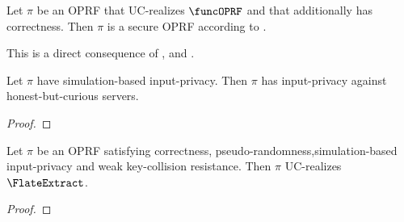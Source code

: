 \begin{corollary}
    \label{coro:UCfromGames}
   Let $\pi$ be an OPRF that UC-realizes $\funcOPRF$ and that additionally has correctness. Then $\pi$ is a secure OPRF according to . 
\end{corollary}
This is a direct consequence of , and .

\begin{lemma}
    \label{lem:GameInputPrivFromSim}
    Let $\pi$ have simulation-based input-privacy. Then $\pi$ has input-privacy against honest-but-curious servers.
\end{lemma}
\begin{proof}
\end{proof}

\begin{lemma}
    \label{lem:UCFLateExtractFromGames}
    Let $\pi$ be an OPRF satisfying correctness, pseudo-randomness,simulation-based input-privacy and weak key-collision resistance. Then $\pi$ UC-realizes $\FlateExtract$.
\end{lemma}
\begin{proof}
\end{proof}